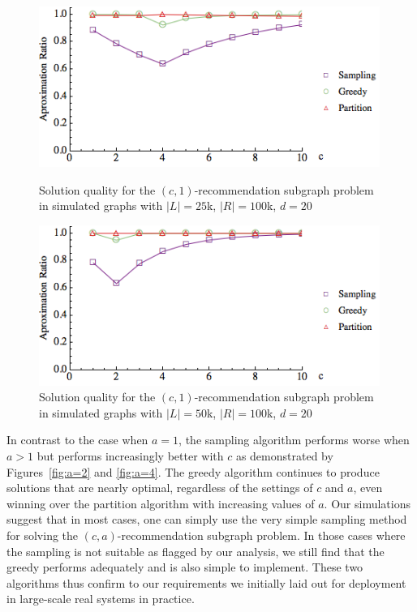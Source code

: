 \begin{figure}[t]
\centering
\begin{minipage}[h]{0.48\textwidth}
\centering
\includegraphics[width=0.99\textwidth]{images/l=25000,r=100000_Greedy_vs_Naive.png}
\vspace{-1cm}
\caption{Solution quality for the $(c, 1)$-recommendation subgraph problem in simulated graphs with $|L|=25$k, $|R|=100$k, $d=20$}\label{fig:a=1:1}
\end{minipage}
\vspace{.2cm}
\hspace{0cm}
\begin{minipage}[h]{0.48\textwidth}
\centering
\includegraphics[width=0.99\textwidth]{images/l=50000,r=100000_Greedy_vs_Naive.png}
\vspace{-1cm}
\caption{Solution quality for the $(c, 1)$-recommendation subgraph problem in simulated graphs with $|L|=50$k, $|R|=100$k, $d=20$}\label{fig:a=1:2}
\end{minipage}
\end{figure}


\vs In contrast to the case when $a=1$, the sampling algorithm
performs worse when $a>1$ but performs increasingly better with $c$ as
demonstrated by Figures~\ref{fig:a=2} and \ref{fig:a=4}. The greedy
algorithm continues to produce solutions that are nearly optimal,
regardless of the settings of $c$ and $a$, even winning over the
partition algorithm with increasing values of $a$. Our simulations
suggest that in most cases, one can simply use the very simple
sampling method for solving the $(c, a)$-recommendation subgraph
problem. In those cases where the sampling is not suitable as flagged
by our analysis, we still find that the greedy performs adequately and
is also simple to implement. These two algorithms thus confirm to our
requirements we initially laid out for deployment in large-scale real
systems in practice.


